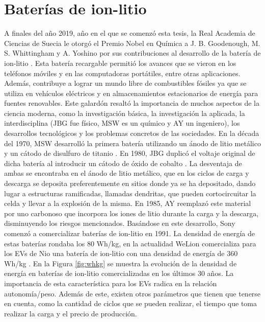 \section{Baterías de ion-litio}

A finales del año 2019, año en el que se comenzó esta tesis, la Real Academia 
de Ciencias de Suecia le otorgó el Premio Nobel en Química a J. B. Goodenough, 
M. S. Whittingham y A. Yoshino por sus contribuciones al desarrollo de la batería 
de ion-litio \cite{nobel}. Esta batería recargable permitió los avances que se vieron en los 
teléfonos móviles y en las computadoras portátiles, entre otras aplicaciones.
Además, contribuye a lograr un mundo libre de combustibles fósiles ya que se utiliza en 
vehículos eléctricos y en almacenamientos estacionarios de energía para fuentes
renovables. Este galardón resaltó la importancia de muchos aspectos de la ciencia
moderna, como la investigación básica, la investigación la aplicada, la 
interdisciplina (JBG fue físico, MSW es un químico y AY un ingeniero), los 
desarrollos tecnológicos y los problemas concretos de las sociedades.
En la década del 1970, MSW desarrolló la primera batería utilizando un ánodo de
litio metálico y un cátodo de disulfuro de titanio \cite{whittingham1976}. En 
1980, JBG duplicó el voltaje original de dicha batería al introducir un cátodo 
de óxido de cobalto \cite{mizushima1980}.
La desventaja de ambas se encontraba en el ánodo de litio metálico, que en los 
ciclos de carga y descarga se deposita preferentemente en sitios donde ya se 
ha depositado, dando lugar a estructuras ramificadas, llamadas dendritas, que 
pueden cortocircuitar la celda y llevar a la explosión de la misma. En 1985,
AY reemplazó este material por uno carbonoso que incorpora los iones de litio
durante la carga y la descarga, disminuyendo los riesgos mencionados. Basándose
en este desarrollo, Sony comenzó a comercializar baterías de ion-litio en 1991.
La densidad de energía de estas baterías rondaba los 80 Wh/kg, en la actualidad
WeLion comercializa para los EVs de Nio una batería de ion-litio con una 
densidad de energía de 360 Wh/kg \cite{li2023700}. En la Figura \ref{fig:whkg} se muestra la 
evolución de la densidad de energía en baterías de ion-litio comercializadas 
en los últimos 30 años. La importancia de esta característica para los EVs 
radica en la relación autonomía/peso. Además de este, existen otros parámetros 
que tienen que tenerse en cuenta, como la cantidad de ciclos que se pueden 
realizar, el tiempo que toma realizar la carga y el 
precio de producción.
